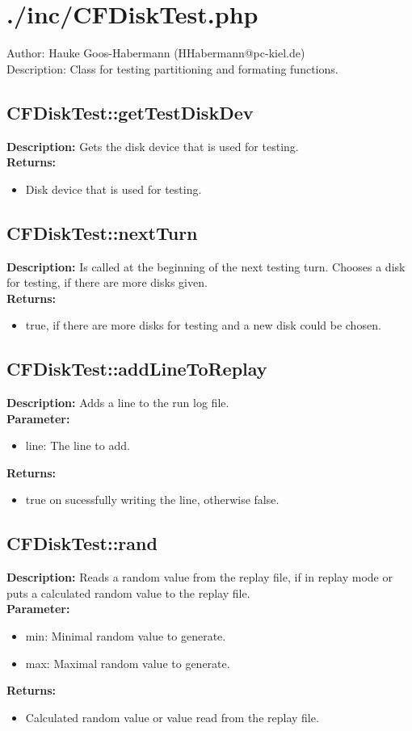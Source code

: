 \newpage\section{./inc/CFDiskTest.php}
 Author: Hauke Goos-Habermann (HHabermann@pc-kiel.de)\\
 Description: Class for testing partitioning and formating functions.\\

\subsection{CFDiskTest::getTestDiskDev}
\textbf{Description:} Gets the disk device that is used for testing.\\
\textbf{Returns:}
\begin{itemize}
\item Disk device that is used for testing.
\end{itemize}

\subsection{CFDiskTest::nextTurn}
\textbf{Description:} Is called at the beginning of the next testing turn. Chooses a disk for testing, if there are more disks given.\\
\textbf{Returns:}
\begin{itemize}
\item true, if there are more disks for testing and a new disk could be chosen.
\end{itemize}

\subsection{CFDiskTest::addLineToReplay}
\textbf{Description:} Adds a line to the run log file.\\
\textbf{Parameter:}
\begin{itemize}
\item line: The line to add.
\end{itemize}
\textbf{Returns:}
\begin{itemize}
\item true on sucessfully writing the line, otherwise false.
\end{itemize}

\subsection{CFDiskTest::rand}
\textbf{Description:} Reads a random value from the replay file, if in replay mode or puts a calculated random value to the replay file.\\
\textbf{Parameter:}
\begin{itemize}
\item min: Minimal random value to generate.
\item max: Maximal random value to generate.
\end{itemize}
\textbf{Returns:}
\begin{itemize}
\item Calculated random value or value read from the replay file.
\end{itemize}

